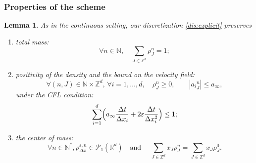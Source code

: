 \documentclass[11pt]{article}
\newcommand{\Subsubsection}{\subsubsection}
\numberwithin{equation}{section}
\def\NN{\mathbb{N}}
\def\RR{\mathbb{R}}
\def\ZZ{\mathbb{Z}}
\def\eps{\varepsilon}
\def\dt{\Delta t}
\def\dx{\Delta x}
\theoremstyle{plain}
\newtheorem{lemma}[theorem]{Lemma}
\theoremstyle{definition}
\begin{document}
\Subsubsection{Properties of the scheme}

\begin{lemma}\label{lem:CFL}
As in the continuous setting, our discretization \eqref{dis:explicit} preserves
\begin{enumerate}
\item total mass:
\begin{equation}\label{eq:conservation}
\forall n \in \NN, \quad \sum_{J \in \ZZ^d} \rho_{J}^n=1;
\end{equation}
\item positivity of the density and the bound on the velocity field:
\[
\forall (n,J) \in \NN \times \ZZ^d, \, \forall i=1,\ldots, d, \quad \rho_{J}^n \geq 0, \qquad |{a_i}_{J}^n| \leq a_\infty,
\]
under the CFL condition:
\begin{equation}\label{CFLlarge}
\sum_{i=1}^d \Bigl(a_\infty \frac{\dt}{\dx_i} + 2\eps \frac{\dt}{\dx_i^2}\Bigr) \leq 1;
\end{equation}
\item the center of mass:
\[
\forall n\in \NN^*, \rho_{\Delta x}^{\eps,n} \in \mathcal{P}_1(\RR^d) \quad\text{and }
\quad \sum_{J\in \ZZ^d} x_J \rho_{J}^n = \sum_{J\in \ZZ^d} x_J \rho_{J}^0.
\]
\end{enumerate}
\end{lemma}
\end{document}
